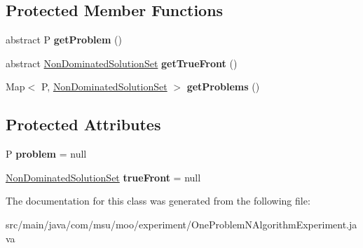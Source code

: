 \subsection*{Protected Member Functions}
\begin{DoxyCompactItemize}
\item 
\hypertarget{classcom_1_1msu_1_1moo_1_1experiment_1_1OneProblemNAlgorithmExperiment_3_01P_01extends_01IProblem_01_4_a44ade28cf960ba97dc5000335a284030}{abstract P {\bfseries get\-Problem} ()}\label{classcom_1_1msu_1_1moo_1_1experiment_1_1OneProblemNAlgorithmExperiment_3_01P_01extends_01IProblem_01_4_a44ade28cf960ba97dc5000335a284030}

\item 
\hypertarget{classcom_1_1msu_1_1moo_1_1experiment_1_1OneProblemNAlgorithmExperiment_3_01P_01extends_01IProblem_01_4_a34821a479b9f95094c10be7340b81614}{abstract \hyperlink{classcom_1_1msu_1_1moo_1_1model_1_1solution_1_1NonDominatedSolutionSet}{Non\-Dominated\-Solution\-Set} {\bfseries get\-True\-Front} ()}\label{classcom_1_1msu_1_1moo_1_1experiment_1_1OneProblemNAlgorithmExperiment_3_01P_01extends_01IProblem_01_4_a34821a479b9f95094c10be7340b81614}

\item 
\hypertarget{classcom_1_1msu_1_1moo_1_1experiment_1_1OneProblemNAlgorithmExperiment_3_01P_01extends_01IProblem_01_4_af101c14d9277ae9d947e612456fee50f}{Map$<$ P, \hyperlink{classcom_1_1msu_1_1moo_1_1model_1_1solution_1_1NonDominatedSolutionSet}{Non\-Dominated\-Solution\-Set} $>$ {\bfseries get\-Problems} ()}\label{classcom_1_1msu_1_1moo_1_1experiment_1_1OneProblemNAlgorithmExperiment_3_01P_01extends_01IProblem_01_4_af101c14d9277ae9d947e612456fee50f}

\end{DoxyCompactItemize}
\subsection*{Protected Attributes}
\begin{DoxyCompactItemize}
\item 
\hypertarget{classcom_1_1msu_1_1moo_1_1experiment_1_1OneProblemNAlgorithmExperiment_3_01P_01extends_01IProblem_01_4_aff43f342cc08af54e689b38093c8fac6}{P {\bfseries problem} = null}\label{classcom_1_1msu_1_1moo_1_1experiment_1_1OneProblemNAlgorithmExperiment_3_01P_01extends_01IProblem_01_4_aff43f342cc08af54e689b38093c8fac6}

\item 
\hypertarget{classcom_1_1msu_1_1moo_1_1experiment_1_1OneProblemNAlgorithmExperiment_3_01P_01extends_01IProblem_01_4_ae833679eb8a1a9a848d3fc1fa9eb72bf}{\hyperlink{classcom_1_1msu_1_1moo_1_1model_1_1solution_1_1NonDominatedSolutionSet}{Non\-Dominated\-Solution\-Set} {\bfseries true\-Front} = null}\label{classcom_1_1msu_1_1moo_1_1experiment_1_1OneProblemNAlgorithmExperiment_3_01P_01extends_01IProblem_01_4_ae833679eb8a1a9a848d3fc1fa9eb72bf}

\end{DoxyCompactItemize}


The documentation for this class was generated from the following file\-:\begin{DoxyCompactItemize}
\item 
src/main/java/com/msu/moo/experiment/One\-Problem\-N\-Algorithm\-Experiment.\-java\end{DoxyCompactItemize}
